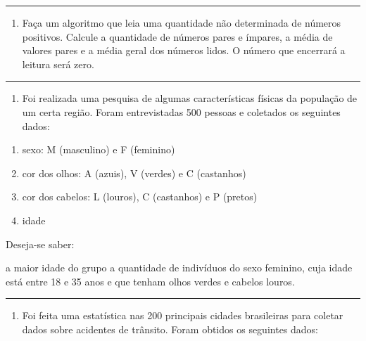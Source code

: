 \documentclass[12pt,a4paper]{article}
\renewcommand{\linethickness}{0.05em}
\providecommand{\tightlist}{%
      \setlength{\itemsep}{0pt}\setlength{\parskip}{0pt}}
\begin{document}
    \begin{center}\rule{0.5\linewidth}{\linethickness}\end{center}

\begin{enumerate}
\def\labelenumi{\arabic{enumi}.}
\setcounter{enumi}{9}
\tightlist
\item
  Faça um algoritmo que leia uma quantidade não determinada de números
  positivos. Calcule a quantidade de números pares e ímpares, a média de
  valores pares e a média geral dos números lidos. O número que
  encerrará a leitura será zero.
\end{enumerate}

    \begin{center}\rule{0.5\linewidth}{\linethickness}\end{center}

\begin{enumerate}
\def\labelenumi{\arabic{enumi}.}
\setcounter{enumi}{10}
\tightlist
\item
  Foi realizada uma pesquisa de algumas características físicas da
  população de um certa região. Foram entrevistadas 500 pessoas e
  coletados os seguintes dados:
\end{enumerate}

\begin{enumerate}
\def\labelenumi{\alph{enumi})}
\item
  sexo: M (masculino) e F (feminino)
\item
  cor dos olhos: A (azuis), V (verdes) e C (castanhos)
\item
  cor dos cabelos: L (louros), C (castanhos) e P (pretos)
\item
  idade
\end{enumerate}

Deseja-se saber:

a maior idade do grupo a quantidade de indivíduos do sexo feminino, cuja
idade está entre 18 e 35 anos e que tenham olhos verdes e cabelos
louros.

    \begin{center}\rule{0.5\linewidth}{\linethickness}\end{center}

\begin{enumerate}
\def\labelenumi{\arabic{enumi}.}
\setcounter{enumi}{11}
\tightlist
\item
  Foi feita uma estatística nas 200 principais cidades brasileiras para
  coletar dados sobre acidentes de trânsito. Foram obtidos os seguintes
  dados:
\end{enumerate}
\end{document}
